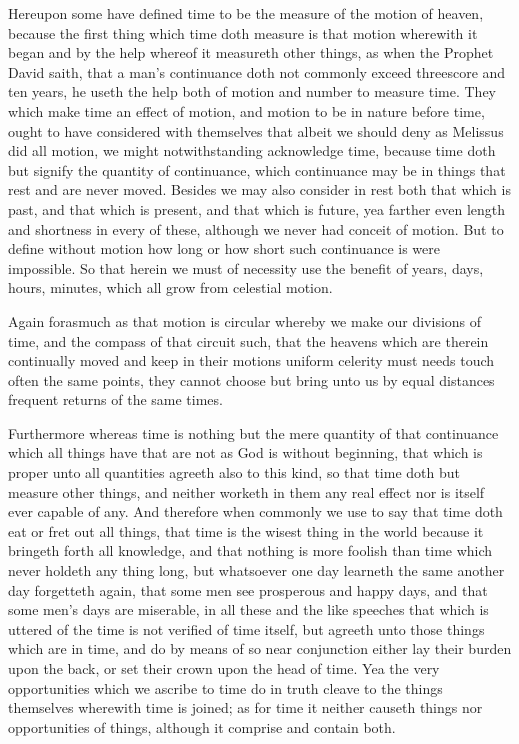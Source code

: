 Hereupon some have defined time to be the measure of the motion of heaven, because the first thing which time doth measure is that motion wherewith it began and by the help whereof it measureth other things, as when the Prophet David saith, that a man’s continuance doth not commonly exceed threescore and ten years, he useth the help both of motion and number to measure time. They which make time an effect of motion, and motion to be in nature before time, ought to have considered with themselves that albeit we should deny as Melissus did all motion, we might notwithstanding acknowledge time, because time doth but signify the quantity of continuance, which continuance may be in things that rest and are never moved. Besides we may also consider in rest both that which is past, and that which is present, and that which is future, yea farther even length and shortness in every of these, although we never had conceit of motion. But to define without motion how long or how short such continuance is were impossible. So that herein we must of necessity use the benefit of years, days, hours, minutes, which all grow from celestial motion.

Again forasmuch as that motion is circular whereby we make our divisions of time, and the compass of that circuit such, that the heavens which are therein continually moved and keep in their motions uniform celerity must needs touch often the same points, they cannot choose but bring unto us by equal distances frequent returns of the same times.

Furthermore whereas time is nothing but the mere quantity of that continuance which all things have that are not as God  is without beginning,
 that which is proper unto all quantities agreeth also to this kind, so that time doth but measure other things, and neither worketh in them any real effect nor is itself ever capable of any. And therefore when commonly we use to say that time doth eat or fret out all things, that time is the wisest thing in the world because it bringeth forth all knowledge, and that nothing is more foolish than time which never holdeth any thing long, but whatsoever one day learneth the same another day forgetteth again, that some men see prosperous and happy days, and that some men’s days are miserable, in all these and the like speeches that which is uttered of the time is not verified of time itself, but agreeth unto those things which are in time, and do by means of so near conjunction either lay their burden upon the back, or set their crown upon the head of time. Yea the very opportunities which we ascribe to time do in truth cleave to the things themselves wherewith time is joined; as for time it neither causeth things nor opportunities of things, although it comprise and contain both.

